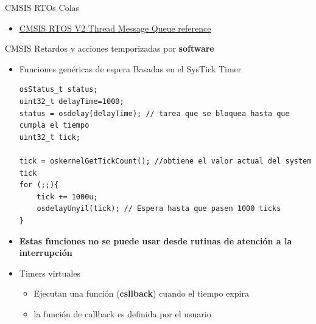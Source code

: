 \begin{frame}[fragile]{CMSIS RTOs Colas}
\begin{itemize}
         \item[] \href{https://arm-software.github.io/CMSIS_5/RTOS2/html/group__CMSIS__RTOS__Message.html}{CMSIS RTOS V2 Thread Message Queue reference}
    \end{itemize}     
\end{frame}


\begin{frame}[fragile]{CMSIS Retardos y acciones temporizadas por \textbf{software}}
\begin{itemize}
    \item Funciones genéricas de espera Basadas en el SysTick Timer
    \begin{verbatim}
osStatus_t status;
uint32_t delayTime=1000;
status = osdelay(delayTime); // tarea que se bloquea hasta que cumpla el tiempo
uint32_t tick;

tick = oskernelGetTickCount(); //obtiene el valor actual del system tick
for (;;){
    tick += 1000u;
    osdelayUnyil(tick); // Espera hasta que pasen 1000 ticks
}   
    \end{verbatim}
    \item \textbf{Estas funciones no se puede usar desde rutinas de atención a la interrupción}
    \item Timers virtuales
        \begin{itemize}
            \item Ejecutan una función (\textbf{csllback}) cuando el tiempo expira
            \item la función de callback es definida por el usuario
        \end{itemize}
\end{itemize}
    
\end{frame}

